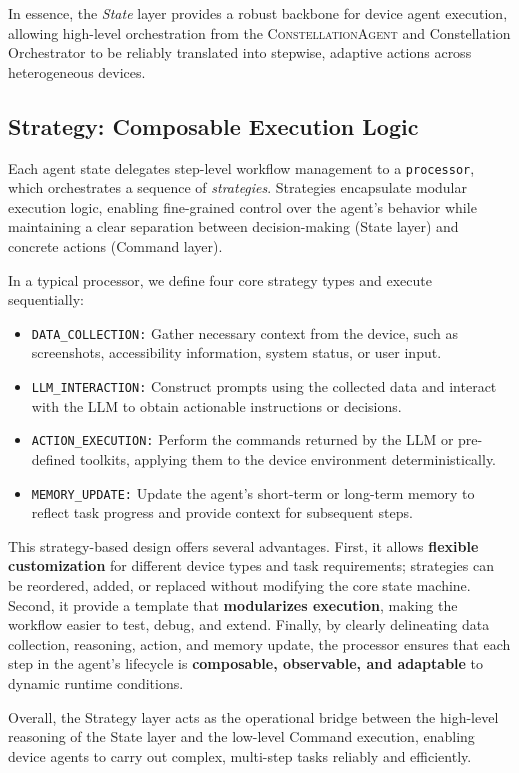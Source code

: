 \documentclass[10pt]{article} %
\newcommand{\cagent}{\textsc{ConstellationAgent}\xspace}
\begin{document}
In essence, the \emph{State} layer provides a robust backbone for device agent execution, allowing high-level orchestration from the \cagent and Constellation Orchestrator to be reliably translated into stepwise, adaptive actions across heterogeneous devices.


\subsection{Strategy: Composable Execution Logic}
Each agent state delegates step-level workflow management to a \texttt{processor}, which orchestrates a sequence of \emph{strategies}. Strategies encapsulate modular execution logic, enabling fine-grained control over the agent's behavior while maintaining a clear separation between decision-making (State layer) and concrete actions (Command layer).

In a typical processor, we define four core strategy types and execute sequentially:
\begin{itemize}
    \item \texttt{DATA\_COLLECTION:} Gather necessary context from the device, such as screenshots, accessibility information, system status, or user input.
    \item \texttt{LLM\_INTERACTION:} Construct prompts using the collected data and interact with the LLM to obtain actionable instructions or decisions.
    \item \texttt{ACTION\_EXECUTION:} Perform the commands returned by the LLM or pre-defined toolkits, applying them to the device environment deterministically.
    \item \texttt{MEMORY\_UPDATE:} Update the agent's short-term or long-term memory to reflect task progress and provide context for subsequent steps.
\end{itemize}

This strategy-based design offers several advantages. First, it allows \textbf{flexible customization} for different device types and task requirements; strategies can be reordered, added, or replaced without modifying the core state machine. Second, it provide a template that \textbf{modularizes execution}, making the workflow easier to test, debug, and extend. Finally, by clearly delineating data collection, reasoning, action, and memory update, the processor ensures that each step in the agent's lifecycle is \textbf{composable, observable, and adaptable} to dynamic runtime conditions.

Overall, the Strategy layer acts as the operational bridge between the high-level reasoning of the State layer and the low-level Command execution, enabling device agents to carry out complex, multi-step tasks reliably and efficiently.
\end{document}
